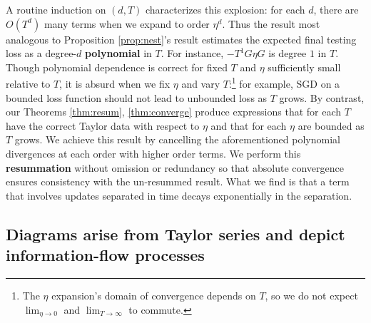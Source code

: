 \documentclass[anon,12pt]{colt2021} %
\begin{document}
            A routine induction on $(d,T)$ characterizes this explosion: for
            each $d$, there are $O(T^d)$ many terms when we expand to order
            $\eta^d$.  Thus the result most analogous to Proposition
            \ref{prop:nest}'s result estimates the expected final testing loss
            as a degree-$d$ \textbf{polynomial} in $T$.  For instance,
            \colorbox{moogold}{$-T^1G\eta G$} is degree $1$ in $T$.  Though
            polynomial dependence is correct for fixed $T$ and $\eta$
            sufficiently small relative to $T$, it is absurd when we fix $\eta$
            and vary
            $T$:\footnote{%
                The $\eta$ expansion's domain of convergence
                depends on $T$, so we do not expect $\lim_{\eta\to 0}$
                and $\lim_{T\to\infty}$ to commute.%
            }
            for example, SGD on a bounded loss function should not lead to 
            unbounded loss as $T$ grows.  By contrast, our
            Theorems \ref{thm:resum}, \ref{thm:converge} produce expressions
            that for each $T$ have the correct Taylor data with respect to
            $\eta$ and that for each $\eta$ are bounded as $T$ grows.  We
            achieve this result by cancelling the aforementioned polynomial
            divergences at each order with higher order terms.  We perform this
            \textbf{resummation} without omission or redundancy so
            that absolute convergence ensures consistency with the un-resummed
            result.  What we find is that 
            a term that involves updates
            separated in time decays exponentially in the separation.

        \subsection{Diagrams arise from Taylor series and depict information-flow processes}\label{sect:diagrams}
\end{document}
